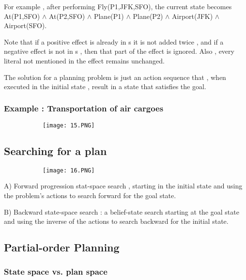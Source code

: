 \documentclass{article}
\begin{document}
For example , after performing Fly(P1,JFK,SFO), the current state becomes At(P1,SFO) $\land$ At(P2,SFO) $\land$ Plane(P1) $\land$ Plane(P2)  $\land$ Airport(JFK) $\land$ Airport(SFO).

Note that if a positive effect is already in s it is not added twice , and if a negative effect is not in s , then that part of the effect is ignored. Also , every literal not mentioned in the effect remains unchanged.

The solution for a planning problem is just an action sequence that , when executed in the initial state , result in a state that satisfies the goal.

\vspace{20mm}

\subsubsection{Example : Transportation of air cargoes}

\begin{figure}[ht!]
  \centering
  \begin{subfigure}[b]{0.6\linewidth}
    \texttt{[image: 15.PNG]}
  \end{subfigure}
\end{figure}

\subsection{Searching for a plan}

\begin{figure}[ht!]
  \centering
  \begin{subfigure}[b]{0.6\linewidth}
    \texttt{[image: 16.PNG]}
  \end{subfigure}
\end{figure}

A) Forward progression stat-space search , starting in the initial state and using the problem's actions to search forward for the goal state.

B) Backward state-space search : a belief-state search starting at the goal state and using the inverse of the actions to search backward for the initial state.

\subsection{Partial-order Planning}

\subsubsection{State space vs. plan space}
\end{document}
